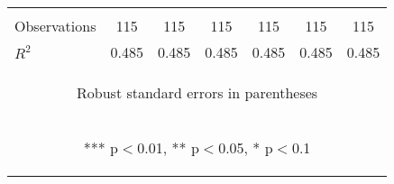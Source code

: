 \begin{center}
\begin{tabular}{lcccccc}
\vspace{4pt} & \begin{footnotesize}\end{footnotesize} & \begin{footnotesize}\end{footnotesize} & \begin{footnotesize}\end{footnotesize} & \begin{footnotesize}\end{footnotesize} & \begin{footnotesize}\end{footnotesize} & \begin{footnotesize}\end{footnotesize} \\
Observations & 115 & 115 & 115 & 115 & 115 & 115 \\
 $R^2$ & 0.485 & 0.485 & 0.485 & 0.485 & 0.485 & 0.485 \\ \hline
\multicolumn{7}{c}{\begin{footnotesize} Robust standard errors in parentheses\end{footnotesize}} \\
\multicolumn{7}{c}{\begin{footnotesize} *** p$<$0.01, ** p$<$0.05, * p$<$0.1\end{footnotesize}} \\
\end{tabular}
\end{center}
